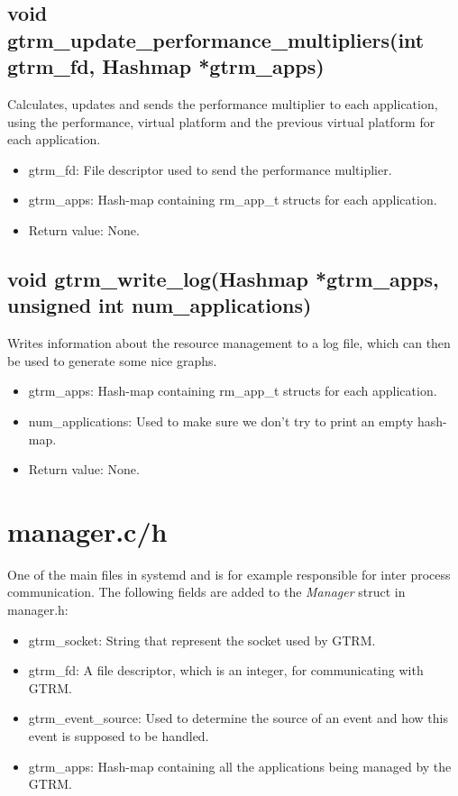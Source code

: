 \documentclass[nobiblatex]{LTHthesis}
\begin{document}
\subsection{void gtrm\_update\_performance\_multipliers(int gtrm\_fd, Hashmap *gtrm\_apps)}
Calculates, updates and sends the performance multiplier to each application, using the performance, virtual platform and the previous virtual platform for each application.
\begin{itemize} 
\item gtrm\_fd: File descriptor used to send the performance multiplier.
\item gtrm\_apps: Hash-map containing rm\_app\_t structs for each application.
\item Return value: None.
\end{itemize}

\subsection{void gtrm\_write\_log(Hashmap *gtrm\_apps, unsigned int num\_applications)}
Writes information about the resource management to a log file, which can then be used to generate some nice graphs.
\begin{itemize} 
\item gtrm\_apps: Hash-map containing rm\_app\_t structs for each application.
\item num\_applications: Used to make sure we don't try to print an empty hash-map.
\item Return value: None.
\end{itemize}

\section{manager.c/h}
One of the main files in systemd and is for example responsible for inter process communication. The following fields are added to the \emph{Manager} struct in manager.h:
\begin{itemize}
\item gtrm\_socket: String that represent the socket used by GTRM.
\item gtrm\_fd: A file descriptor, which is an integer, for communicating with GTRM.
\item gtrm\_event\_source: Used to determine the source of an event and how this event is supposed to be handled.
\item gtrm\_apps: Hash-map containing all the applications being managed by the GTRM.
\end{itemize}
\end{document}
